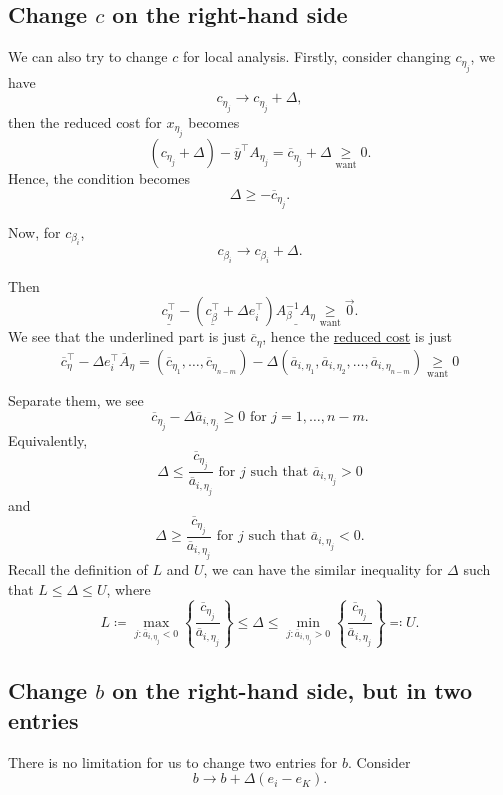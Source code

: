 \subsection{Change \(c\) on the right-hand side}
We can also try to change \(c\) for local analysis. Firstly, consider changing \(c_{\eta_{j}}\), we have
\[
	c_{\eta_{j}}\to c_{\eta_{j}}+\Delta,
\]
then the reduced cost for \(x_{\eta_{j}}\) becomes
\[
	(c_{\eta_{j}}+\Delta) - \overline{y}^{\top}A_{\eta_{j}} = \overline{c}_{\eta_{j}}+\Delta\underset{\text{want}}{\geq} 0.
\]
Hence, the condition becomes
\[
	\Delta\geq -\overline{c}_{\eta_{j}}.
\]

Now, for \(c_{\beta_{i}}\),
\[
	c_{\beta_{i}}\to c_{\beta_{i}}+\Delta.
\]

Then
\[
	\underline{c_{\eta}^{\top}} - (\underline{c_{\beta}^{\top}} + \Delta e_{i}^{\top}) \underline{A^{-1}_{\beta}A_{\eta}}\underset{\text{want}}{\geq} \vec{0}.
\]
We see that the underlined part is just \(\overline{c}_{\eta}\), hence the \hyperref[def:reduced-cost]{reduced cost} is just
\[
	\overline{c}_{\eta}^{\top} - \Delta e_{i}^{\top}\overline{A}_{\eta} = (\overline{c}_{\eta_1}, \ldots , \overline{c}_{\eta_{n-m}}) - \Delta(\overline{a}_{i, \eta_1}, \overline{a}_{i, \eta_2}, \ldots , \overline{a}_{i, \eta_{n-m}})\underset{\text{want}}{\geq} 0
\]

Separate them, we see
\[
	\overline{c}_{\eta_{j}} - \Delta \overline{a}_{i, \eta_{j}} \geq 0 \text{ for }j = 1, \ldots , n-m.
\]
Equivalently,
\[
	\Delta\leq \frac{\overline{c}_{\eta_{j}}}{\overline{a}_{i, \eta_{j}}} \text{ for }j \text{ such that }\overline{a}_{i, \eta_{j}}>0
\]
and
\[
	\Delta\geq \frac{\overline{c}_{\eta_{j}}}{\overline{a}_{i, \eta_{j}}} \text{ for }j \text{ such that }\overline{a}_{i, \eta_{j}}<0.
\]
Recall the definition of \(L\) and \(U\), we can have the similar inequality for \(\Delta\) such that \(L\leq \Delta\leq U\), where
\[
	L \coloneqq \max_{j\colon \overline{a}_{i, \eta_{j}} < 0}\left\{ \frac{\overline{c}_{\eta_{j}}}{\overline{a}_{i, \eta_{j}}} \right\} \leq \Delta \leq \min_{j\colon \overline{a}_{i, \eta_{j}} > 0}\left\{ \frac{\overline{c}_{\eta_{j}}}{\overline{a}_{i, \eta_{j}}} \right\} \eqqcolon U.
\]

\subsection{Change \(b\) on the right-hand side, but in two entries}
There is no limitation for us to change two entries for \(b\). Consider
\[
	b\to b+\Delta(e_{i} - e_{K}).
\]

